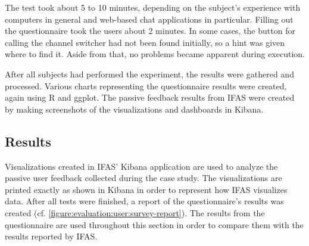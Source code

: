 The test took about 5 to 10 minutes, depending on the subject's experience with computers in general and web-based chat applications in particular.
Filling out the questionnaire took the users about 2 minutes.
In some cases, the button for calling the channel switcher had not been found initially, so a hint was given where to find it.
Aside from that, no problems became apparent during execution.

After all subjects had performed the experiment, the results were gathered and processed.
Various charts representing the questionnaire results were created, again using R and ggplot.
The passive feedback results from \ac{IFAS} were created by making screenshots of the visualizations and dashboards in Kibana.

\subsection{Results}

Visualizations created in \ac{IFAS}' Kibana application are used to analyze the passive user feedback collected during the case study.
The visualizations are printed exactly as shown in Kibana in order to represent how \ac{IFAS} visualizes data.
After all tests were finished, a report of the questionnaire's results was created (cf. \cref{figure:evaluation:user:survey-report}).
The results from the questionnaire are used throughout this section in order to compare them with the results reported by \ac{IFAS}.

